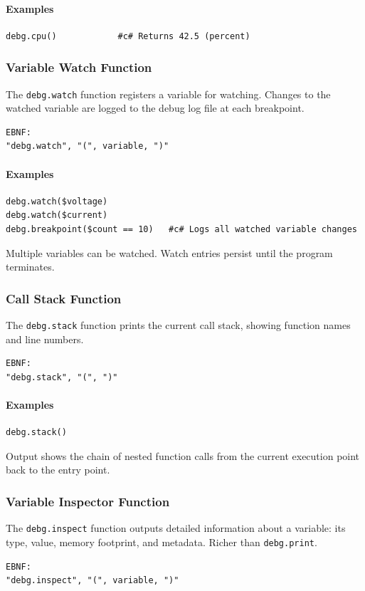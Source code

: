 \paragraph{Examples}
\begin{verbatim}
debg.cpu()            #c# Returns 42.5 (percent)
\end{verbatim}

\subsubsection{Variable Watch Function}
The \texttt{debg.watch} function registers a variable for watching. Changes to the watched variable are logged to the debug log file at each breakpoint.
\begin{verbatim}
EBNF:
"debg.watch", "(", variable, ")"
\end{verbatim}

\paragraph{Examples}
\begin{verbatim}
debg.watch($voltage)
debg.watch($current)
debg.breakpoint($count == 10)   #c# Logs all watched variable changes
\end{verbatim}

Multiple variables can be watched. Watch entries persist until the program terminates.

\subsubsection{Call Stack Function}
The \texttt{debg.stack} function prints the current call stack, showing function names and line numbers.
\begin{verbatim}
EBNF:
"debg.stack", "(", ")"
\end{verbatim}

\paragraph{Examples}
\begin{verbatim}
debg.stack()
\end{verbatim}

Output shows the chain of nested function calls from the current execution point back to the entry point.

\subsubsection{Variable Inspector Function}
The \texttt{debg.inspect} function outputs detailed information about a variable: its type, value, memory footprint, and metadata. Richer than \texttt{debg.print}.
\begin{verbatim}
EBNF:
"debg.inspect", "(", variable, ")"
\end{verbatim}

